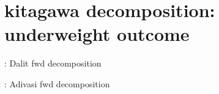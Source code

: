 \documentclass{article}
\begin{document}








\newpage
\section{kitagawa decomposition: underweight outcome}


\begin{table}[H]
    \centering
    \footnotesize %
    \caption{: Dalit fwd decomposition}
    \label{tab:sumstat}
\end{table}

\begin{table}[H]
    \centering
    \footnotesize %
    \caption{: Adivasi fwd decomposition}
    \label{tab:sumstat}
\end{table}
\end{document}
